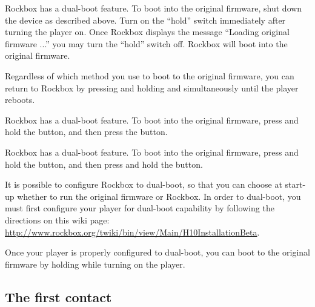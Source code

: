   {
    {  
    Rockbox has a dual-boot feature.  To boot into the original firmware, shut 
    down the device as described above.  Turn on the ``hold'' switch 
    immediately after turning the player on. Once Rockbox displays the 
    message ``Loading original firmware ...'' you may turn the ``hold'' 
    switch off.  Rockbox will boot into the original firmware. 
    
    
    Regardless of which method you use to boot to the original firmware, you can 
    return to Rockbox by pressing and holding \ButtonMenu{} and \ButtonSelect{} 
    simultaneously until the player reboots.
    }

    {
    Rockbox has a dual-boot feature.  To boot into the original firmware, 
    press and hold the \ButtonRec{} button, and then press the \ButtonOn{} 
    button.
    }
  
    { 
    Rockbox has a dual-boot feature.  To boot into the original firmware, 
    press and hold the \ButtonRec{} button, and then press and hold the 
    \ButtonOn{} button.
    }
  
    {
    It is possible to configure Rockbox to dual-boot, so that you can choose 
    at start-up whether to run the original firmware or Rockbox. In order to 
    dual-boot, you must first configure your player for dual-boot capability 
    by following the directions on this wiki page: 
    \url{http://www.rockbox.org/twiki/bin/view/Main/H10InstallationBeta}.  
    
    Once your player is properly configured to dual-boot, you can boot to the 
    original firmware by holding \ButtonLeft{} while turning on the player.
    }
  }


\subsection{The first contact}

